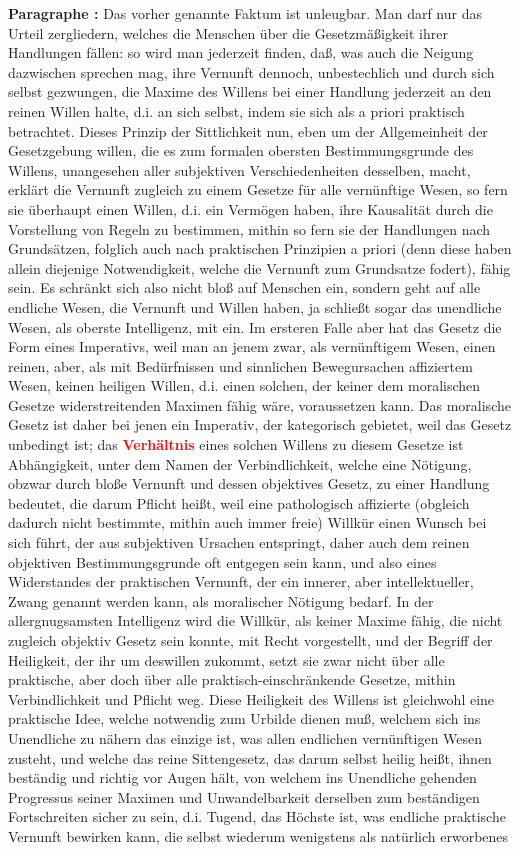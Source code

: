 \documentclass[a4paper,12pt,twoside]{book}
\newcommand{\match}[1]{\textcolor{red}{\textbf{#1}}}
\begin{document}
	\textbf{Paragraphe : }Das vorher genannte Faktum ist unleugbar. Man darf nur das Urteil zergliedern, welches die Menschen über die Gesetzmäßigkeit ihrer Handlungen fällen: so wird man jederzeit finden, daß, was auch die Neigung dazwischen sprechen mag, ihre Vernunft dennoch, unbestechlich und durch sich selbst gezwungen, die Maxime des Willens bei einer Handlung jederzeit an den reinen Willen halte, d.i. an sich selbst, indem sie sich als a priori praktisch betrachtet. Dieses Prinzip der Sittlichkeit nun, eben um der Allgemeinheit der Gesetzgebung willen, die es zum formalen obersten Bestimmungsgrunde des Willens, unangesehen aller subjektiven Verschiedenheiten desselben, macht, erklärt die Vernunft zugleich zu einem Gesetze für alle vernünftige Wesen, so fern sie überhaupt einen Willen, d.i. ein Vermögen haben, ihre Kausalität durch die Vorstellung von Regeln zu bestimmen, mithin so fern sie der Handlungen nach Grundsätzen, folglich auch nach praktischen Prinzipien a priori (denn diese haben allein diejenige Notwendigkeit, welche die Vernunft zum Grundsatze fodert), fähig sein. Es  schränkt sich also nicht bloß auf Menschen ein, sondern geht auf alle endliche Wesen, die Vernunft und Willen haben, ja schließt sogar das unendliche Wesen, als oberste Intelligenz, mit ein. Im ersteren Falle aber hat das Gesetz die Form eines Imperativs, weil man an jenem zwar, als vernünftigem Wesen, einen reinen, aber, als mit Bedürfnissen und sinnlichen Bewegursachen affiziertem Wesen, keinen heiligen Willen, d.i. einen solchen, der keiner dem moralischen Gesetze widerstreitenden Maximen fähig wäre, voraussetzen kann. Das moralische Gesetz ist daher bei jenen ein Imperativ, der kategorisch gebietet, weil das Gesetz unbedingt ist; das \match{Verhältnis} eines solchen Willens zu diesem Gesetze ist Abhängigkeit, unter dem Namen der Verbindlichkeit, welche eine Nötigung, obzwar durch bloße Vernunft und dessen objektives Gesetz, zu einer Handlung bedeutet, die darum Pflicht heißt, weil eine pathologisch affizierte (obgleich dadurch nicht bestimmte, mithin auch immer freie) Willkür einen Wunsch bei sich führt, der aus subjektiven Ursachen entspringt, daher auch dem reinen objektiven Bestimmungsgrunde oft entgegen sein kann, und also eines Widerstandes der praktischen Vernunft, der ein innerer, aber intellektueller, Zwang genannt werden kann, als moralischer Nötigung bedarf. In der allergnugsamsten Intelligenz wird die Willkür, als keiner Maxime fähig, die nicht zugleich objektiv Gesetz sein konnte, mit Recht vorgestellt, und der Begriff der Heiligkeit, der ihr um deswillen zukommt, setzt sie zwar nicht über alle praktische, aber doch über alle praktisch-einschränkende Gesetze, mithin Verbindlichkeit und Pflicht weg. Diese Heiligkeit des Willens ist gleichwohl eine praktische Idee, welche notwendig zum Urbilde dienen muß, welchem sich ins Unendliche zu nähern das einzige ist, was allen endlichen vernünftigen Wesen zusteht, und welche das reine Sittengesetz, das darum selbst heilig heißt, ihnen beständig und richtig vor Augen hält, von welchem ins Unendliche gehenden Progressus seiner Maximen und Unwandelbarkeit derselben zum beständigen Fortschreiten sicher zu sein, d.i. Tugend, das  Höchste ist, was endliche praktische Vernunft bewirken kann, die selbst wiederum wenigstens als natürlich erworbenes 
\end{document}
